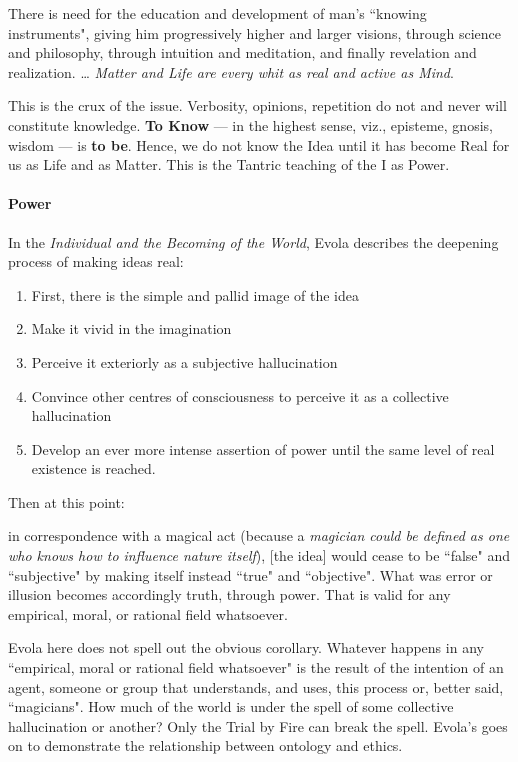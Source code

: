 \begin{quotex}
There is need for the education and development of man's ``knowing instruments", giving him progressively higher and larger visions, through science and philosophy, through intuition and meditation, and finally revelation and realization. … \emph{Matter and Life are every whit as real and active as Mind}.

\end{quotex}
This is the crux of the issue. Verbosity, opinions, repetition do not and never will constitute knowledge. \textbf{To Know} — in the highest sense, viz., episteme, gnosis, wisdom — is \textbf{to be}. Hence, we do not know the Idea until it has become Real for us as Life and as Matter. This is the Tantric teaching of the I as Power.

\paragraph{Power}
In the \emph{Individual and the Becoming of the World}, Evola describes the deepening process of making ideas real:

\begin{enumerate}
\item First, there is the simple and pallid image of the idea 
\item Make it vivid in the imagination 
\item Perceive it exteriorly as a subjective hallucination 
\item Convince other centres of consciousness to perceive it as a collective hallucination 
\item Develop an ever more intense assertion of power until the same level of real existence is reached. 
\end{enumerate}
Then at this point:

\begin{quotex}
in correspondence with a magical act (because a \emph{magician could be defined as one who knows how to influence nature itself}), [the idea] would cease to be ``false" and ``subjective" by making itself instead ``true" and ``objective". What was error or illusion becomes accordingly truth, through power. That is valid for any empirical, moral, or rational field whatsoever. 

\end{quotex}
Evola here does not spell out the obvious corollary. Whatever happens in any ``empirical, moral or rational field whatsoever" is the result of the intention of an agent, someone or group that understands, and uses, this process or, better said, ``magicians". How much of the world is under the spell of some collective hallucination or another? Only the Trial by Fire can break the spell. Evola's goes on to demonstrate the relationship between ontology and ethics.

